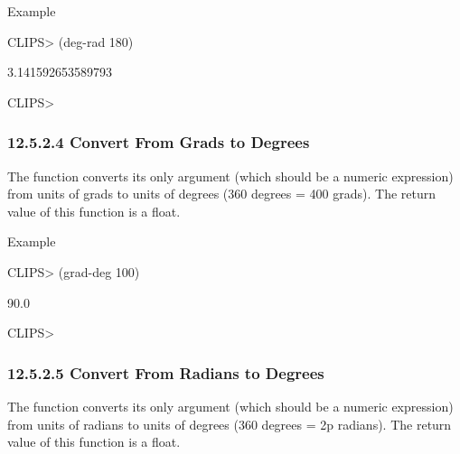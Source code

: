 \documentclass[letterpaper,10pt,english]{sphinxmanual}
\begin{document}

\begin{sphinxVerbatim}[commandchars=\\\{\}]
 
\end{sphinxVerbatim}

Example

CLIPS\textgreater{} (deg-rad 180)

3.141592653589793

CLIPS\textgreater{}


\subsubsection{12.5.2.4 Convert From Grads to Degrees}
\label{\detokenize{actions:convert-from-grads-to-degrees}}
The  function converts its only argument (which should be a
numeric expression) from units of grads to units of degrees (360 degrees
= 400 grads). The return value of this function is a float.


\begin{sphinxVerbatim}[commandchars=\\\{\}]
 
\end{sphinxVerbatim}

Example

CLIPS\textgreater{} (grad-deg 100)

90.0

CLIPS\textgreater{}


\subsubsection{12.5.2.5 Convert From Radians to Degrees}
\label{\detokenize{actions:convert-from-radians-to-degrees}}
The  function converts its only argument (which should be a
numeric expression) from units of radians to units of degrees (360
degrees = 2p radians). The return value of this function is a float.


\begin{sphinxVerbatim}[commandchars=\\\{\}]
 
\end{sphinxVerbatim}
\end{document}
